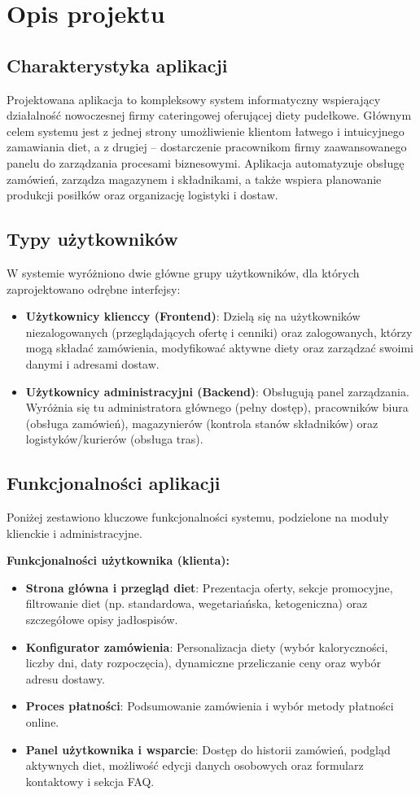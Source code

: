 \chapter{Opis projektu}

\section{Charakterystyka aplikacji}
Projektowana aplikacja to kompleksowy system informatyczny wspierający działalność nowoczesnej firmy cateringowej oferującej diety pudełkowe. Głównym celem systemu jest z jednej strony umożliwienie klientom łatwego i intuicyjnego zamawiania diet, a z drugiej – dostarczenie pracownikom firmy zaawansowanego panelu do zarządzania procesami biznesowymi. Aplikacja automatyzuje obsługę zamówień, zarządza magazynem i składnikami, a także wspiera planowanie produkcji posiłków oraz organizację logistyki i dostaw.

\section{Typy użytkowników}
W systemie wyróżniono dwie główne grupy użytkowników, dla których zaprojektowano odrębne interfejsy:
\begin{itemize}
    \item \textbf{Użytkownicy klienccy (Frontend)}: Dzielą się na użytkowników niezalogowanych (przeglądających ofertę i cenniki) oraz zalogowanych, którzy mogą składać zamówienia, modyfikować aktywne diety oraz zarządzać swoimi danymi i adresami dostaw.
    \item \textbf{Użytkownicy administracyjni (Backend)}: Obsługują panel zarządzania. Wyróżnia się tu administratora głównego (pełny dostęp), pracowników biura (obsługa zamówień), magazynierów (kontrola stanów składników) oraz logistyków/kurierów (obsługa tras).
\end{itemize}

\section{Funkcjonalności aplikacji}
Poniżej zestawiono kluczowe funkcjonalności systemu, podzielone na moduły klienckie i administracyjne.

\textbf{Funkcjonalności użytkownika (klienta):}
\begin{itemize}
    \item \textbf{Strona główna i przegląd diet}: Prezentacja oferty, sekcje promocyjne, filtrowanie diet (np. standardowa, wegetariańska, ketogeniczna) oraz szczegółowe opisy jadłospisów.
    \item \textbf{Konfigurator zamówienia}: Personalizacja diety (wybór kaloryczności, liczby dni, daty rozpoczęcia), dynamiczne przeliczanie ceny oraz wybór adresu dostawy.
    \item \textbf{Proces płatności}: Podsumowanie zamówienia i wybór metody płatności online.
    \item \textbf{Panel użytkownika i wsparcie}: Dostęp do historii zamówień, podgląd aktywnych diet, możliwość edycji danych osobowych oraz formularz kontaktowy i sekcja FAQ.
\end{itemize}

